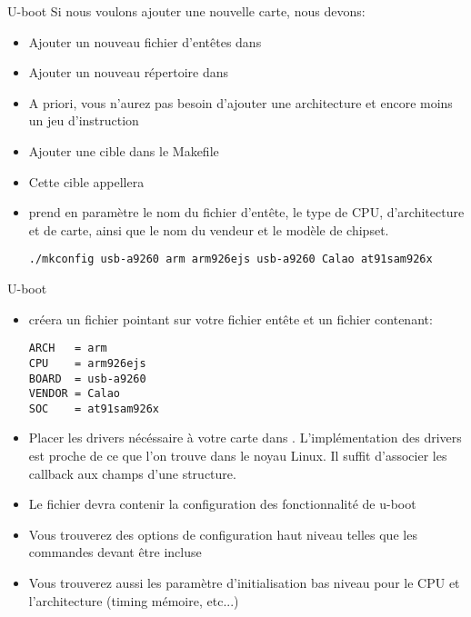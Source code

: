 \begin{frame}[fragile=singleslide]{U-boot}
  Si nous voulons ajouter une nouvelle carte, nous devons:
  \begin{itemize}
  \item Ajouter un nouveau fichier d'entêtes dans 
  \item Ajouter un nouveau répertoire dans 
  \item A priori, vous n'aurez pas besoin d'ajouter une architecture et encore moins un jeu d'instruction
  \item Ajouter une cible dans le Makefile
  \item Cette cible appellera 
  \item {} prend en  paramètre le nom du fichier d'entête,
    le type  de CPU,  d'architecture et de carte,  ainsi que le  nom du
    vendeur et le modèle de chipset.
    \begin{lstlisting}
./mkconfig usb-a9260 arm arm926ejs usb-a9260 Calao at91sam926x
    \end{lstlisting}
  \end{itemize}
\end{frame}

\begin{frame}[fragile=singleslide]{U-boot}
  \begin{itemize}
  \item {} créera  un fichier  pointant sur
    votre fichier entête et un fichier  contenant:
    \begin{lstlisting}
ARCH   = arm
CPU    = arm926ejs
BOARD  = usb-a9260
VENDOR = Calao
SOC    = at91sam926x
    \end{lstlisting}
  \item   Placer   les  drivers   nécéssaire   à   votre  carte   dans
    . L'implémentation des drivers est proche de
    ce que l'on  trouve dans le noyau Linux.  Il suffit d'associer les
    callback aux champs d'une structure.
  \item Le fichier   devra contenir la configuration
    des fonctionnalité de u-boot
  \item Vous trouverez des options de configuration haut niveau telles
    que les commandes devant être incluse
  \item Vous trouverez aussi les paramètre d'initialisation bas niveau
    pour le CPU et l'architecture (timing mémoire, etc...)
  \end{itemize}
\end{frame}

